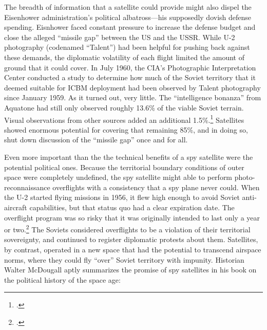 \documentclass[11pt]{memoir}
\begin{document}
The breadth of information that a satellite could provide might also dispel the Eisenhower administration's political albatross---his supposedly dovish defense spending. Eisnhower faced constant pressure to increase the defense budget and close the alleged ``missile gap'' between the US and the USSR. While U-2 photography (codenamed ``Talent'') had been helpful for pushing back against these demands, the diplomatic volatility of each flight limited the amount of ground that it could cover. In July 1960, the CIA's Photographic Interpretation Center conducted a study to determine how much of the Soviet territory that it deemed suitable for ICBM deployment had been observed by Talent photography since January 1959. As it turned out, very little. The ``intelligence bonanza'' from Aquatone had still only observed roughly 13.6\% of the viable Soviet terrain. Visual observations from other sources added an additional 1.5\%.\footcite[A significant portion of this document is redacted, including, for some reason, the page numbers.]{cia_future_1960} Satellites showed enormous potential for covering that remaining 85\%, and in doing so, shut down discussion of the ``missile gap'' once and for all.

Even more important than the the technical benefits of a spy satellite were the potential political ones. Because the territorial boundary conditions of outer space were completely undefined, the spy satellite might able to perform photo-reconnaissance overflights with a consistency that a spy plane never could. When the U-2 started flying missions in 1956, it flew high enough to avoid Soviet anti-aircraft capabilities, but that status quo had a clear expiration date. The overflight program was so risky that it was originally intended to last only a year or two.\footcite[p.~33]{lindgren_trust_2000} The Soviets considered overflights to be a violation of their territorial sovereignty, and continued to register diplomatic protests about them. Satellites, by contrast, operated in a new space that had the potential to transcend airspace norms, where they could fly ``over'' Soviet territory with impunity. Historian Walter McDougall aptly summarizes the promise of spy satellites in his book on the political history of the space age:
\end{document}
